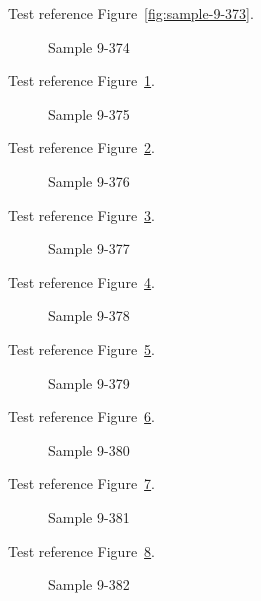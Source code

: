 Test reference Figure~\ref{fig:sample-9-373}.

\begin{figure}[tbhp]
\caption{Sample 9-374}
\label{fig:sample-9-374}
\end{figure}

Test reference Figure~\ref{fig:sample-9-374}.

\begin{figure}[tbhp]
\caption{Sample 9-375}
\label{fig:sample-9-375}
\end{figure}

Test reference Figure~\ref{fig:sample-9-375}.

\begin{figure}[tbhp]
\caption{Sample 9-376}
\label{fig:sample-9-376}
\end{figure}

Test reference Figure~\ref{fig:sample-9-376}.

\begin{figure}[tbhp]
\caption{Sample 9-377}
\label{fig:sample-9-377}
\end{figure}

Test reference Figure~\ref{fig:sample-9-377}.

\begin{figure}[tbhp]
\caption{Sample 9-378}
\label{fig:sample-9-378}
\end{figure}

Test reference Figure~\ref{fig:sample-9-378}.

\begin{figure}[tbhp]
\caption{Sample 9-379}
\label{fig:sample-9-379}
\end{figure}

Test reference Figure~\ref{fig:sample-9-379}.

\begin{figure}[tbhp]
\caption{Sample 9-380}
\label{fig:sample-9-380}
\end{figure}

Test reference Figure~\ref{fig:sample-9-380}.

\begin{figure}[tbhp]
\caption{Sample 9-381}
\label{fig:sample-9-381}
\end{figure}

Test reference Figure~\ref{fig:sample-9-381}.

\begin{figure}[tbhp]
\caption{Sample 9-382}
\label{fig:sample-9-382}
\end{figure}

